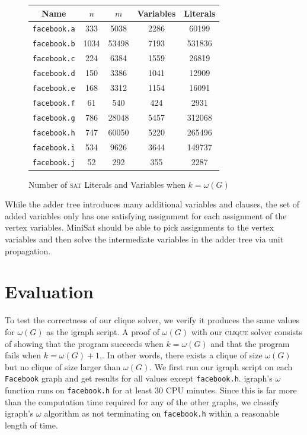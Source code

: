 \documentclass[]{article}
\newcommand{\clique}{\textsc{clique}}
\newcommand{\sat}{\textsc{sat}}
\begin{document}
	\begin{figure}[H]
		\centering
		\caption{Number of \sat{} Literals and Variables when $k = \omega(G)$}
		\begin{tabular}{|c|c|c|c|c|}
			\hline
			Name                & $n$  & $m$   & Variables & Literals \\ \hline
			\texttt{facebook.a} & 333  & 5038  & 2286      & 60199    \\ \hline
			\texttt{facebook.b} & 1034 & 53498 & 7193      & 531836   \\ \hline
			\texttt{facebook.c} & 224  & 6384  & 1559      & 26819    \\ \hline
			\texttt{facebook.d} & 150  & 3386  & 1041      & 12909    \\ \hline
			\texttt{facebook.e} & 168  & 3312  & 1154      & 16091    \\ \hline
			\texttt{facebook.f} & 61   & 540   & 424       & 2931     \\ \hline
			\texttt{facebook.g} & 786  & 28048 & 5457      & 312068   \\ \hline
			\texttt{facebook.h} & 747  & 60050 & 5220      & 265496   \\ \hline
			\texttt{facebook.i} & 534  & 9626  & 3644      & 149737   \\ \hline
			\texttt{facebook.j} & 52   & 292   & 355       & 2287     \\ \hline
		\end{tabular}
	\end{figure}
	
	While the adder tree introduces many additional variables and clauses, the set of added variables only has one satisfying assignment for each assignment of the vertex variables. MiniSat should be able to pick assignments to the vertex variables and then solve the intermediate variables in the adder tree via unit propagation\cite{matesoos}.

	\section{Evaluation}
	
	To test the correctness of our clique solver, we verify it produces the same values for $\omega(G)$ as the igraph script. A proof of $\omega(G)$ with our \clique{} solver consists of showing that the program succeeds when $k = \omega(G)$ and that the program fails when $k = \omega(G) + 1$,. In other words, there exists a clique of size $\omega(G)$ but no clique of size larger than $\omega(G)$. We first run our igraph script on each \texttt{Facebook} graph and get results for all values except \texttt{facebook.h}. igraph's $\omega$ function runs on \texttt{facebook.h} for at least 30 CPU minutes. Since this is far more than the computation time required for any of the other graphs, we classify igraph's $\omega$ algorithm as not terminating on \texttt{facebook.h} within a reasonable length of time.
	
\end{document}
